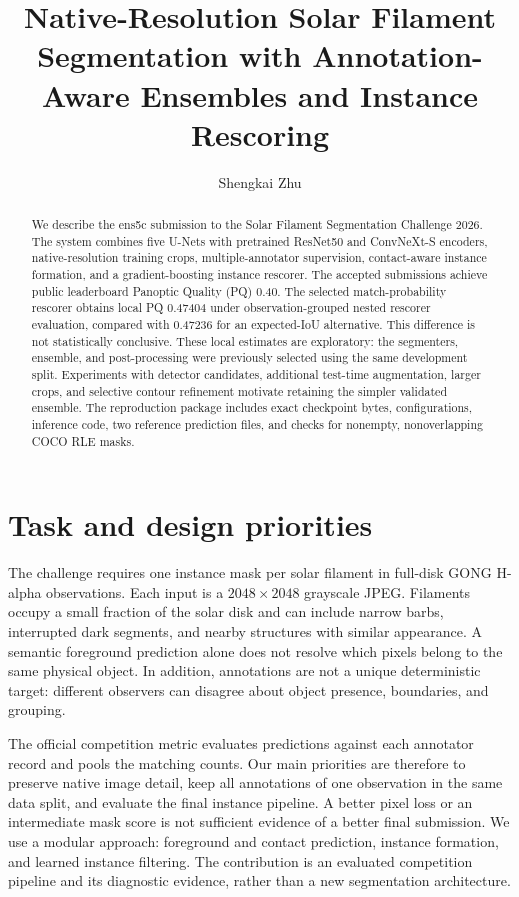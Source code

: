 \documentclass[sigconf,nonacm]{acmart}
\title{Native-Resolution Solar Filament Segmentation with Annotation-Aware Ensembles and Instance Rescoring}
\author{Shengkai Zhu}
\affiliation{\institution{Independent researcher}\country{}}
\begin{document}
\begin{abstract}
We describe the ens5c submission to the Solar Filament Segmentation Challenge
2026. The system combines five U-Nets with pretrained ResNet50 and ConvNeXt-S
encoders, native-resolution training crops, multiple-annotator supervision,
contact-aware instance formation, and a gradient-boosting instance rescorer.
The accepted submissions achieve public leaderboard Panoptic Quality (PQ)
0.40. The selected match-probability rescorer obtains local PQ 0.47404 under
observation-grouped nested rescorer evaluation, compared with 0.47236 for an
expected-IoU alternative. This difference is not statistically conclusive.
These local estimates are exploratory: the segmenters, ensemble, and
post-processing were previously selected using the same development split.
Experiments with detector candidates, additional test-time augmentation,
larger crops, and selective contour refinement motivate retaining the simpler
validated ensemble. The reproduction package includes exact checkpoint
bytes, configurations, inference code, two reference prediction files,
and checks for nonempty, nonoverlapping COCO RLE masks.
\end{abstract}
\maketitle

\section{Task and design priorities}
The challenge requires one instance mask per solar filament in full-disk
GONG H-alpha observations. Each input is a $2048\times2048$ grayscale JPEG.
Filaments occupy a small fraction of the solar disk and can include narrow
barbs, interrupted dark segments, and nearby structures with similar
appearance. A semantic foreground prediction alone does not resolve which
pixels belong to the same physical object. In addition, annotations are
not a unique deterministic target: different observers can disagree about
object presence, boundaries, and grouping.

The official competition metric evaluates predictions against each
annotator record and pools the matching counts. Our main priorities are
therefore to preserve native image detail, keep all annotations of one
observation in the same data split, and evaluate the final instance pipeline.
A better pixel loss or an intermediate mask score is not sufficient evidence
of a better final submission. We use a modular approach: foreground and
contact prediction, instance formation, and learned instance filtering.
The contribution is an evaluated competition pipeline and its diagnostic
evidence, rather than a new segmentation architecture.
\end{document}
